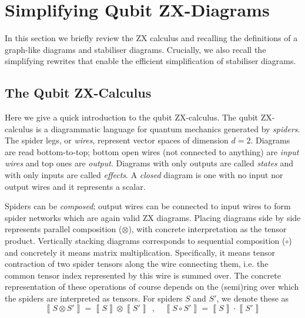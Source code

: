 \section{Simplifying Qubit ZX-Diagrams}

In this section we briefly review the ZX calculus
and recalling the definitions of a graph-like diagrams and stabiliser diagrams.
Crucially, we also recall the simplifying rewrites that enable the efficient
simplification of stabiliser diagrams.

\subsection{The Qubit ZX-Calculus}

Here we give a quick introduction to the qubit ZX-calculus.
The qubit ZX-calculus is a diagrammatic language for quantum mechanics generated by \textit{spiders}.
The spider legs, or \emph{wires}, represent vector spaces of dimension $d=2$.
Diagrams are read bottom-to-top; bottom open wires (not connected to anything) are \emph{input wires} and top ones are \emph{output}.
Diagrams with only outputs are called \emph{states} and with only inputs are called \emph{effects}.
A \emph{closed} diagram is one with no input nor output wires
and it represents a scalar.

Spiders can be \emph{composed};
output wires can be connected to input wires
to form spider networks which are again valid ZX diagrams.
Placing diagrams side by side represents parallel composition ($\otimes$),
with concrete interpretation as the tensor product.
Vertically stacking diagrams corresponds to sequential composition ($\circ$) and concretely it means matrix multiplication.
Specifically, it means tensor contraction of two spider tensors along the wire connecting them, i.e. the common tensor index represented by this wire is summed over.
The concrete representation of these operations of course depends on the (semi)ring over which the spiders are interpreted as tensors.
For spiders $S$ and $S'$, we denote these as
\begin{equation}
\left\llbracket S \otimes S' \right\rrbracket = \left\llbracket S \right\rrbracket \otimes \left\llbracket S' \right\rrbracket ~~,\quad
	\left\llbracket S \circ S' \right\rrbracket = \left\llbracket S \right\rrbracket \cdot \left\llbracket S' \right\rrbracket 
\end{equation} 


